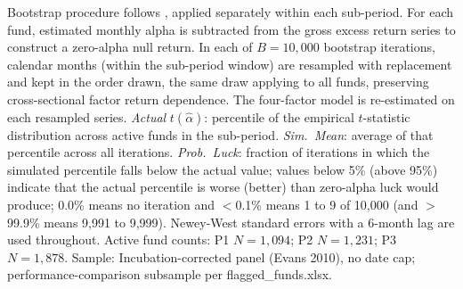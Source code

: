 \begin{table}[!htbp]
\begin{minipage}{\tabletempwidth}
\begin{singlespace}
Bootstrap procedure follows \textcite{FamaFrench2010}, applied separately within each sub-period. For each fund, estimated monthly alpha is subtracted from the gross excess return series to construct a zero-alpha null return. In each of $B = 10{,}000$ bootstrap iterations, calendar months (within the sub-period window) are resampled with replacement and kept in the order drawn, the same draw applying to all funds, preserving cross-sectional factor return dependence. The \textcite{Carhart1997} four-factor model is re-estimated on each resampled series. \textit{Actual} $t(\hat{\alpha})$: percentile of the empirical $t$-statistic distribution across active funds in the sub-period. \textit{Sim.\ Mean}: average of that percentile across all iterations. \textit{Prob.\ Luck}: fraction of iterations in which the simulated percentile falls below the actual value; values below 5\% (above 95\%) indicate that the actual percentile is worse (better) than zero-alpha luck would produce; 0.0\% means no iteration and $<$0.1\% means 1 to 9 of 10,000 (and $>$99.9\% means 9,991 to 9,999). Newey-West standard errors with a 6-month lag are used throughout. Active fund counts: P1 $N = 1,094$; P2 $N = 1,231$; P3 $N = 1,878$. Sample: Incubation-corrected panel (Evans 2010), no date cap; performance-comparison subsample per flagged\_funds.xlsx.
\end{singlespace}
\end{minipage}
\end{table}

